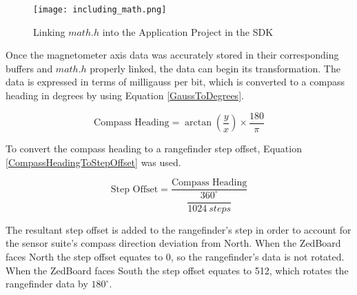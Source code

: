 \begin{figure}[H]
	\centerline{\texttt{[image: including\_math.png]}}
	\caption{Linking $math.h$ into the Application Project in the SDK}
	\label{including_math}
\end{figure}

Once the magnetometer axis data was accurately stored in their corresponding buffers and $math.h$ properly linked, the data can begin its transformation. The data is expressed in terms of milligauss per bit, which is converted to a compass heading in degrees by using Equation \ref{GaussToDegrees}.

\begin{equation}
	\textrm{Compass Heading} = \arctan(\dfrac{y}{x})\times\dfrac{180}{\pi}
	\label{GaussToDegrees}
\end{equation}

To convert the compass heading to a rangefinder step offset, Equation \ref{CompassHeadingToStepOffset} was used.

\begin{equation}
	\textrm{Step Offset} = \dfrac{\textrm{Compass Heading}}{\dfrac{360^\circ}{1024\ steps}}
	\label{CompassHeadingToStepOffset}
\end{equation}

The resultant step offset is added to the rangefinder's step in order to account for the sensor suite's compass direction deviation from North. When the ZedBoard faces North the step offset equates to 0, so the rangefinder's data is not rotated. When the ZedBoard faces South the step offset equates to 512, which rotates the rangefinder data by $180^\circ$.






